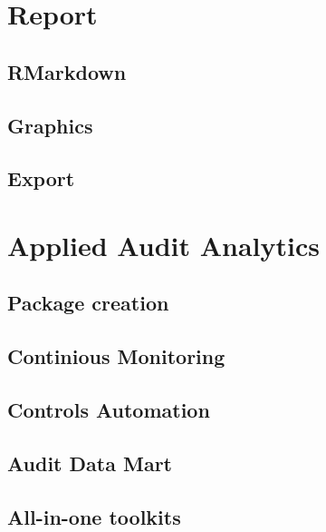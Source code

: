 \documentclass[
]{book}
\begin{document}
\hypertarget{report}{%
\chapter{Report}\label{report}}

\hypertarget{rmarkdown}{%
\section{RMarkdown}\label{rmarkdown}}

\hypertarget{graphics}{%
\section{Graphics}\label{graphics}}

\hypertarget{export}{%
\section{Export}\label{export}}

\hypertarget{applied-audit-analytics}{%
\chapter{Applied Audit Analytics}\label{applied-audit-analytics}}

\hypertarget{package-creation}{%
\section{Package creation}\label{package-creation}}

\hypertarget{continious-monitoring}{%
\section{Continious Monitoring}\label{continious-monitoring}}

\hypertarget{controls-automation}{%
\section{Controls Automation}\label{controls-automation}}

\hypertarget{audit-data-mart}{%
\section{Audit Data Mart}\label{audit-data-mart}}

\hypertarget{all-in-one-toolkits}{%
\section{All-in-one toolkits}\label{all-in-one-toolkits}}
\end{document}

